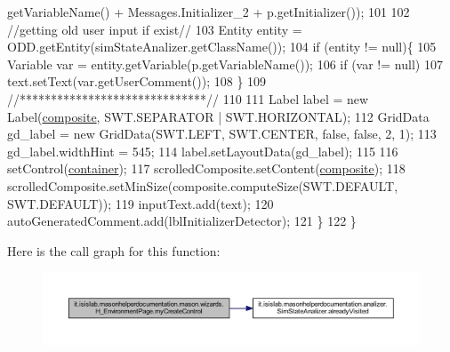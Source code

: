 \begin{DoxyCode}
      getVariableName() + Messages.Initializer\_2 + p.getInitializer());
101             
102             \textcolor{comment}{//getting old user input if exist//}
103             Entity entity = ODD.getEntity(simStateAnalizer.getClassName());
104             \textcolor{keywordflow}{if} (entity != null)\{
105                 Variable var = entity.getVariable(p.getVariableName());
106                 \textcolor{keywordflow}{if} (var != null)
107                     text.setText(var.getUserComment());
108             \}
109             \textcolor{comment}{//******************************//}
110             
111             Label label = \textcolor{keyword}{new} Label(\hyperlink{classit_1_1isislab_1_1masonhelperdocumentation_1_1mason_1_1wizards_1_1_h___environment_page_acd16b35445be03e0527a45d03cf61573}{composite}, SWT.SEPARATOR | SWT.HORIZONTAL);
112             GridData gd\_label = \textcolor{keyword}{new} GridData(SWT.LEFT, SWT.CENTER, \textcolor{keyword}{false}, \textcolor{keyword}{false}, 2, 1);
113             gd\_label.widthHint = 545;
114             label.setLayoutData(gd\_label);
115             
116             setControl(\hyperlink{classit_1_1isislab_1_1masonhelperdocumentation_1_1mason_1_1wizards_1_1_h___environment_page_ae24bc5d12a792cdda1cba4f0b66f1c4c}{container});
117             scrolledComposite.setContent(\hyperlink{classit_1_1isislab_1_1masonhelperdocumentation_1_1mason_1_1wizards_1_1_h___environment_page_acd16b35445be03e0527a45d03cf61573}{composite});
118             scrolledComposite.setMinSize(composite.computeSize(SWT.DEFAULT, SWT.DEFAULT));  
119             inputText.add(text);
120             autoGeneratedComment.add(lblInitializerDetector);
121         \}
122     \}
\end{DoxyCode}


Here is the call graph for this function\-:
\nopagebreak
\begin{figure}[H]
\begin{center}
\leavevmode
\includegraphics[width=350pt]{classit_1_1isislab_1_1masonhelperdocumentation_1_1mason_1_1wizards_1_1_h___environment_page_a09a8404f1e96b68ec8bcb29a3da65558_cgraph}
\end{center}
\end{figure}




